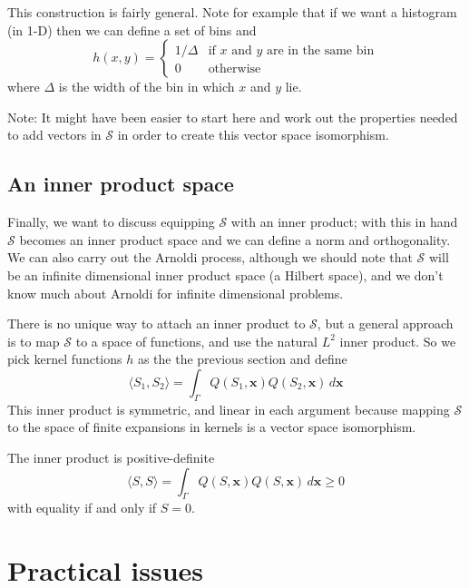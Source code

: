 \documentclass[12pt]{article}
\begin{document}
This construction is fairly general.  Note for example that if we want a histogram (in 1-D) then we can define a set of bins and
\begin{equation}
h(x,y) = \begin{cases}
1/\Delta & \text{if $x$ and $y$ are in the same bin}\\
0 & \text{otherwise} 
\end{cases}
\end{equation}
where $\Delta$ is the width of the bin in which $x$ and $y$ lie.

Note: It might have been easier to start here and work out the properties needed to add vectors in $\mathcal{S}$ in order to create this vector space isomorphism.

\subsection{An inner product space}

Finally, we want to discuss equipping $\mathcal{S}$ with an inner product; with this in hand $\mathcal{S}$ becomes an inner product space and we can define a norm and orthogonality.  We can also carry out the Arnoldi process, although we should note that $\mathcal{S}$ will be an infinite dimensional inner product space (a Hilbert space), and we don't know much about Arnoldi for infinite dimensional problems.

There is no unique way to attach an inner product to $\mathcal{S}$, but a general approach is to map $\mathcal{S}$ to a space of functions, and use the natural $L^2$ inner product.  So we pick kernel functions $h$ as the the previous section and define
\begin{equation}
\langle S_1, S_2 \rangle = \int_{\Gamma} Q(S_1, \mathbf{x}) Q(S_2, \mathbf{x}) \, d\mathbf{x}
\end{equation}
This inner product is symmetric, and linear in each argument because mapping $\mathcal{S}$ to the space of finite expansions in kernels is a vector space isomorphism.

The inner product is positive-definite 
\begin{equation}
\langle S, S \rangle = \int_{\Gamma} Q(S, \mathbf{x}) Q(S, \mathbf{x}) \, d\mathbf{x} \geq 0
\end{equation}
with equality if and only if $S = 0$.

\section{Practical issues}
\end{document}
